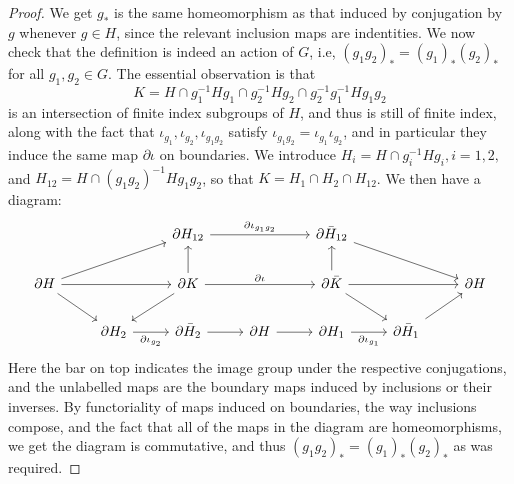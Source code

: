 \documentclass[10pt,a4paper]{amsart}
\begin{document}
\begin{proof}
    We get \( g_* \) is the same homeomorphism as that induced by conjugation by \( g \) whenever \( g \in H \), since the relevant inclusion maps are indentities. We now check that the definition is indeed an action of \( G \), i.e, \( (g_1 g_2)_* = (g_1)_* (g_2)_* \) for all \( g_1, g_2 \in G \). The essential observation is that 
   \[
       K = H \cap g_1^{-1}Hg_1 \cap g_2^{-1}Hg_2 \cap g_2^{-1}g_1^{-1}Hg_1g_2
   \]
   is an intersection of finite index subgroups of \( H \), and thus is still of finite index, along with the fact that \( \iota_{g_1}, \iota_{g_2}, \iota_{g_1g_2} \) satisfy \( \iota_{g_1g_2} = \iota_{g_1} \iota_{g_2} \), and in particular they induce the same map \( \partial \iota \) on boundaries. We introduce \( H_i = H \cap g^{-1}_i H g_i, i = 1,2, \) and \( H_{12} = H \cap (g_1g_2)^{-1} H g_1g_2 \), so that \( K = H_1 \cap H_2 \cap H_{12} \). We then have a diagram:
\[\begin{tikzcd}
	&& \partial H_{12} && \partial \bar H_{12} && \\
	\partial H && \partial K && \partial \bar K && \partial H \\
	& \partial H_2 & \partial \bar H_2 & \partial H & \partial H_1 & \partial \bar H_1
	\arrow[from=1-3, to=1-5, "\partial \iota_{g_1 g_2}"]
	\arrow[from=1-5, to=2-7]
	\arrow[from=2-1, to=1-3]
	\arrow[from=2-1, to=2-3]
	\arrow[from=2-1, to=3-2]
	\arrow[from=2-3, to=1-3]
	\arrow[from=2-3, to=2-5, "\partial \iota"]
	\arrow[from=2-3, to=3-2]
	\arrow[from=2-5, to=1-5]
	\arrow[from=2-5, to=2-7]
	\arrow[from=2-5, to=3-6]
	\arrow[from=3-2, to=3-3, "\partial \iota_{g_2}"']
	\arrow[from=3-3, to=3-4]
	\arrow[from=3-4, to=3-5]
	\arrow[from=3-5, to=3-6, "\partial \iota_{g_1}"']
	\arrow[from=3-6, to=2-7]
\end{tikzcd}\]
Here the bar on top indicates the image group under the respective conjugations, and the unlabelled maps are the boundary maps induced by inclusions or their inverses. By functoriality of maps induced on boundaries, the way inclusions compose, and the fact that all of the maps in the diagram are homeomorphisms, we get the diagram is commutative, and thus \( (g_1g_2)_* = (g_1)_* (g_2)_* \) as was required.
\end{proof}
\end{document}
